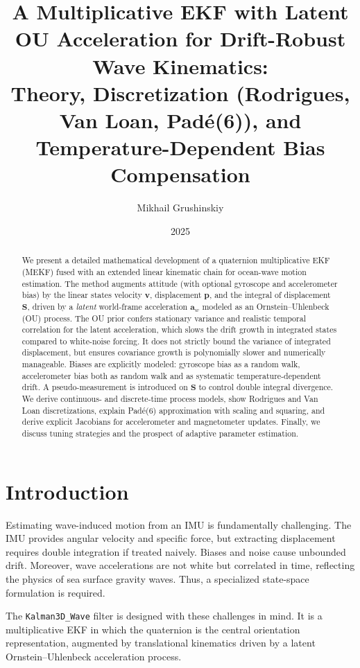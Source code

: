 \documentclass[10pt]{extarticle}
\title{A Multiplicative EKF with Latent OU Acceleration for Drift-Robust Wave Kinematics: \\
Theory, Discretization (Rodrigues, Van Loan, Pad\'e(6)), and Temperature-Dependent Bias Compensation}
\author{Mikhail Grushinskiy}
\date{2025}
\begin{document}
\maketitle

\begin{abstract}
We present a detailed mathematical development of a quaternion multiplicative EKF (MEKF) fused with an extended 
linear kinematic chain for ocean-wave motion estimation. 
The method augments attitude (with optional gyroscope and accelerometer bias) by the linear states velocity $\bm v$, displacement $\bm p$, 
and the integral of displacement $\bm S$, driven by a \emph{latent} world-frame acceleration $\bm a_w$ modeled as an Ornstein--Uhlenbeck (OU) process. The OU prior confers stationary variance and realistic temporal correlation for the latent acceleration, which slows the drift growth in integrated states compared to white-noise forcing. It does not strictly bound the variance of integrated displacement, but ensures covariance growth is polynomially slower and numerically manageable.
Biases are explicitly modeled: gyroscope bias as a random walk, accelerometer bias both as random walk and as systematic temperature-dependent drift. 
A pseudo-measurement is introduced on $\bm S$ to control double integral divergence. 
We derive continuous- and discrete-time process models, show Rodrigues and Van Loan discretizations, 
explain Pad\'e(6) approximation with scaling and squaring, and derive explicit Jacobians for accelerometer and magnetometer updates. 
Finally, we discuss tuning strategies and the prospect of adaptive parameter estimation.
\end{abstract}

\section{Introduction}
Estimating wave-induced motion from an IMU is fundamentally challenging. The IMU provides angular velocity and specific force, 
but extracting displacement requires double integration if treated naively. Biases and noise cause unbounded drift. 
Moreover, wave accelerations are not white but correlated in time, reflecting the physics of sea surface gravity waves. 
Thus, a specialized state-space formulation is required. 

The \texttt{Kalman3D\_Wave} filter is designed with these challenges in mind. 
It is a multiplicative EKF in which the quaternion is the central orientation representation, 
augmented by translational kinematics driven by a latent Ornstein--Uhlenbeck acceleration process. 
\end{document}
